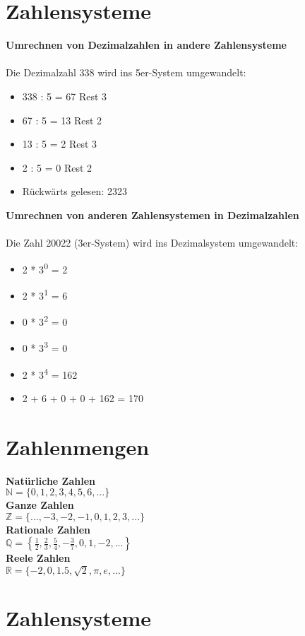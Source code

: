 \section{Zahlensysteme}

\textbf{Umrechnen von Dezimalzahlen in andere Zahlensysteme}\\\\
Die Dezimalzahl 338 wird ins 5er-System umgewandelt:
\begin{itemize}
    \item 338 : 5 = 67 Rest 3
    \item 67 : 5 = 13 Rest 2
    \item 13 : 5 = 2 Rest 3
    \item 2 : 5 = 0 Rest 2
    \item Rückwärts gelesen: 2323
\end{itemize}
\bigskip
\textbf{Umrechnen von anderen Zahlensystemen in Dezimalzahlen}\\\\
Die Zahl 20022 (3er-System) wird ins Dezimalsystem umgewandelt:
\begin{itemize}
    \item 2 * 3\textsuperscript{0} = 2
    \item 2 * 3\textsuperscript{1} = 6
    \item 0 * 3\textsuperscript{2} = 0
    \item 0 * 3\textsuperscript{3} = 0
    \item 2 * 3\textsuperscript{4} = 162
    \item 2 + 6 + 0 + 0 + 162 = 170
\end{itemize}
\section{Zahlenmengen}

{\bf Natürliche Zahlen}\\
\(\mathbb{N} = \{0,1,2,3,4,5,6,...\}\) \\
{\bf Ganze Zahlen}\\
\(\mathbb{Z} = \{...,-3,-2,-1,0,1,2,3,...\}\) \\
{\bf Rationale Zahlen}\\
\(\mathbb{Q} = \left\{ \frac{1}{2}, \frac{2}{3}, \frac{5}{4}, -\frac{3}{7}, 0, 1, -2, ... \right\}\) \\
{\bf Reele Zahlen}\\
\(\mathbb{R} = \{ -2, 0, 1.5, \sqrt{2}, \pi, e, ... \}\)

\section{Zahlensysteme}

